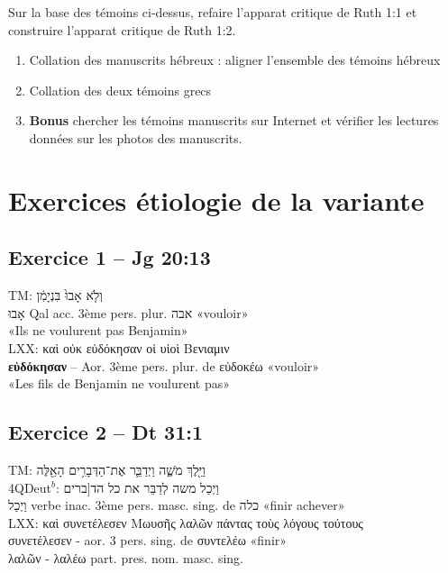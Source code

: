 \documentclass[11pt,a4paper]{article}
\begin{document}
Sur la base des témoins ci-dessus, refaire l'apparat critique de Ruth 1:1 et construire l'apparat critique de Ruth 1:2.\\
\begin{enumerate}
    \item Collation des manuscrits hébreux : aligner l'ensemble des témoins hébreux
    \item Collation des deux témoins grecs
    \item \textbf{Bonus} chercher les témoins manuscrits sur Internet et vérifier les lectures données sur les photos des manuscrits.
\end{enumerate}

\section{Exercices étiologie de la variante}

\subsection{Exercice 1 – Jg 20:13}
TM: \texthebrew{וְלֹ֤א אָבוּ֙ בִּנְיָמִ֔ן} \\
\texthebrew{אָבוּ} Qal acc. 3ème pers. plur. \texthebrew{אבה} «vouloir» \\
«Ils ne voulurent pas Benjamin» \\
LXX: \textgreek{καὶ οὐκ εὐδόκησαν οἱ υἱοὶ Βενιαμιν} \\
\textbf{εὐδόκησαν} – Aor. 3ème pers. plur. de \textgreek{εὐδοκέω} «vouloir» \\
«Les fils de Benjamin ne voulurent pas»

\subsection{Exercice 2 – Dt 31:1}
TM: \texthebrew{וַיֵּ֖לֶךְ מֹשֶׁ֑ה וַיְדַבֵּ֛ר אֶת־הַדְּבָרִ֥ים הָאֵ֖לֶּה} \\
4QDeut${^b}$: \texthebrew{וַיְכַל משה לְדַבֵּר את כל הד[ברים} \\
\texthebrew{וַיְכַל} verbe inac. 3ème pers. masc. sing. de \texthebrew{כלה} «finir achever» \\
LXX: \textgreek{καὶ συνετέλεσεν Μωυσῆς λαλῶν πάντας τοὺς λόγους τούτους} \\
\textgreek{συνετέλεσεν} - aor. 3 pers. sing. de \textgreek{συντελέω} «finir» \\
\textgreek{λαλῶν} - \textgreek{λαλέω} part. pres. nom. masc. sing.
\end{document}
